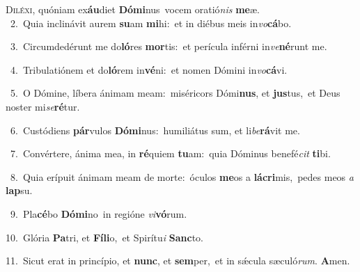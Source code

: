 \lettrine{\initial\textcolor{\initialcolor}{D}}{iléxi,} quóniam ex\-\textbf{áu}\-diet \textbf{Dó}\-\textbf{mi}nus~\star vocem oratió\textit{nis} \textbf{me}\-æ.\\
{\numbfont\textcolor{\numbcolor}{~2.}}~Quia inclinávit aurem \textbf{su}\-am \textbf{mi}\-hi:~\star et in diébus meis in\-\textit{vo}\-\textbf{cá}bo.\par
{\numbfont\textcolor{\numbcolor}{~3.}}~Circumdedérunt me do\-\textbf{ló}\-res \textbf{mor}\-tis:~\star et perícula inférni in\-\textit{ve}\-\textbf{né}runt me.\par
{\numbfont\textcolor{\numbcolor}{~4.}}~Tribulatiónem et do\-\textbf{ló}\-rem in\-\textbf{vé}\-ni:~\star et nomen Dómini in\-\textit{vo}\-\textbf{cá}vi.\par
{\numbfont\textcolor{\numbcolor}{~5.}}~O Dómine, líbera ánimam meam:~\dagger miséricors Dómi\-\textbf{nus}\-, et \textbf{jus}\-tus,~\star et Deus noster mi\-\textit{se}\-\textbf{ré}tur.\par
{\numbfont\textcolor{\numbcolor}{~6.}}~Custódiens \textbf{pár}\-vulos \textbf{Dó}\-\textbf{mi}nus:~\star humiliátus sum, et li\-\textit{be}\-\textbf{rá}vit me.\par
{\numbfont\textcolor{\numbcolor}{~7.}}~Convértere, ánima mea, in \textbf{ré}\-quiem \textbf{tu}\-am:~\star quia Dóminus benefé\textit{cit} \textbf{ti}\-bi.\par
{\numbfont\textcolor{\numbcolor}{~8.}}~Quia erípuit ánimam meam de morte:~\dagger óculos \textbf{me}\-os a \textbf{lá}\-\textbf{cri}mis,~\star pedes meos \textit{a} \textbf{lap}\-su.\par
{\numbfont\textcolor{\numbcolor}{~9.}}~Pla\-\textbf{cé}\-bo \textbf{Dó}\-\textbf{mi}no~\star in regióne \textit{vi}\-\textbf{vó}rum.\par
{\numbfont\textcolor{\numbcolor}{10.}}~Glória \textbf{Pa}\-tri, et \textbf{Fí}\-\textbf{li}o,~\star et Spirítu\textit{i} \textbf{Sanc}\-to.\par
{\numbfont\textcolor{\numbcolor}{11.}}~Sicut erat in princípio, et \textbf{nunc}\-, et \textbf{sem}\-per,~\star et in sǽcula sæculó\-\textit{rum}\-. \textbf{A}\-men.\par
